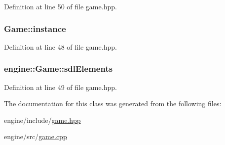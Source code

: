 Definition at line 50 of file game.\+hpp.

\subsubsection[{\texorpdfstring{instance}{instance}}]{ Game\+::instance\hspace{0.3cm}{\ttfamily [static]}}\hypertarget{classengine_1_1_game_aed34cffcaed0e8027c11d68b1d42258b}{}\label{classengine_1_1_game_aed34cffcaed0e8027c11d68b1d42258b}


Definition at line 48 of file game.\+hpp.

\subsubsection[{\texorpdfstring{sdl\+Elements}{sdlElements}}]{ engine\+::\+Game\+::sdl\+Elements}\hypertarget{classengine_1_1_game_ab4a295f7b30b191183d5411f5fa5d66b}{}\label{classengine_1_1_game_ab4a295f7b30b191183d5411f5fa5d66b}


Definition at line 49 of file game.\+hpp.



The documentation for this class was generated from the following files\+:\begin{DoxyCompactItemize}
\item 
engine/include/\hyperlink{game_8hpp}{game.\+hpp}\item 
engine/src/\hyperlink{game_8cpp}{game.\+cpp}\end{DoxyCompactItemize}
